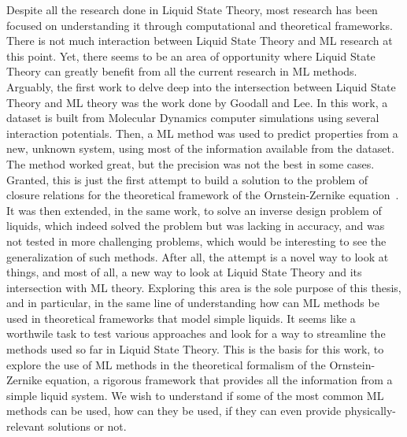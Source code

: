 Despite all the research done in Liquid State Theory, most research has been focused on
understanding it through computational and theoretical frameworks. There is not much
interaction between Liquid State Theory and ML research at this point.
Yet, there seems to be an area of opportunity where Liquid State Theory can greatly
benefit from all the current research in ML methods. Arguably, the first work to delve deep 
into the intersection between Liquid State Theory and ML theory was the work done by
Goodall and Lee.
In this work, a dataset is built from Molecular Dynamics computer simulations using several
interaction potentials. Then, a ML method was used to predict properties from a new,
unknown system, using most of the information available from the dataset.
The method worked great, but the precision was not the best in some cases. Granted, this
is just the first attempt to build a solution to the problem of closure relations
for the theoretical framework of the Ornstein-Zernike equation~\cite{hansenTheorySimpleLiquids2013}.
It was then extended, in the same work, to solve an inverse design problem of liquids, 
which indeed solved the problem but was lacking in accuracy, and was not tested in
more challenging problems, which would be interesting to see the generalization of
such methods.
After all, the attempt is a novel way to look at things, and most of all, a new way to
look at Liquid State Theory and its intersection with ML theory.
Exploring this area is the sole purpose of this thesis, and in particular, in the same
line of understanding how can ML methods be used in theoretical frameworks that model
simple liquids. It seems like a worthwile task to test various approaches and look for a
way to streamline the methods used so far in Liquid State Theory. This is the basis for
this work, to explore the use of ML methods in the theoretical formalism of the
Ornstein-Zernike equation, a rigorous framework that provides all the information from
a simple liquid system. We wish to understand if some of the most common ML methods
can be used, how can they be used, if they can even provide physically-relevant
solutions or not.

